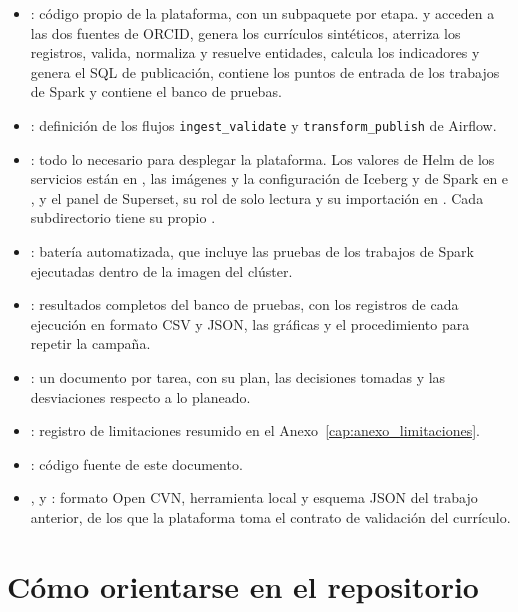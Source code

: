 \begin{itemize}
  \sloppy
  \item {}: código propio de la plataforma, con un
  subpaquete por etapa.  y  acceden a las
  dos fuentes de ORCID,  genera los currículos
  sintéticos,  aterriza los registros,  valida,
  normaliza y resuelve entidades,  calcula los indicadores y
  genera el SQL de publicación,  contiene los puntos de
  entrada de los trabajos de Spark y  contiene el banco de
  pruebas.
  \item {}: definición de los flujos \texttt{ingest\_validate} y
  \texttt{transform\_publish} de Airflow.
  \item {}: todo lo necesario para desplegar la plataforma. Los
  valores de Helm de los servicios están en , las
  imágenes y la configuración de Iceberg y de Spark en  e
  , y el panel de Superset, su rol de solo lectura y su
  importación en . Cada subdirectorio tiene su propio
  .
  \item {}: batería automatizada, que incluye las pruebas de los
  trabajos de Spark ejecutadas dentro de la imagen del clúster.
  \item {}: resultados completos del banco de pruebas, con
  los registros de cada ejecución en formato CSV y JSON, las gráficas y el
  procedimiento para repetir la campaña.
  \item {}: un documento por tarea, con su plan, las
  decisiones tomadas y las desviaciones respecto a lo planeado.
  \item {}: registro de limitaciones
  resumido en el Anexo~\ref{cap:anexo_limitaciones}.
  \item {}: código fuente de este documento.
  \item {},  y :
  formato Open CVN, herramienta local y esquema JSON del trabajo anterior, de
  los que la plataforma toma el contrato de validación del currículo.
\end{itemize}

\section*{Cómo orientarse en el repositorio}

